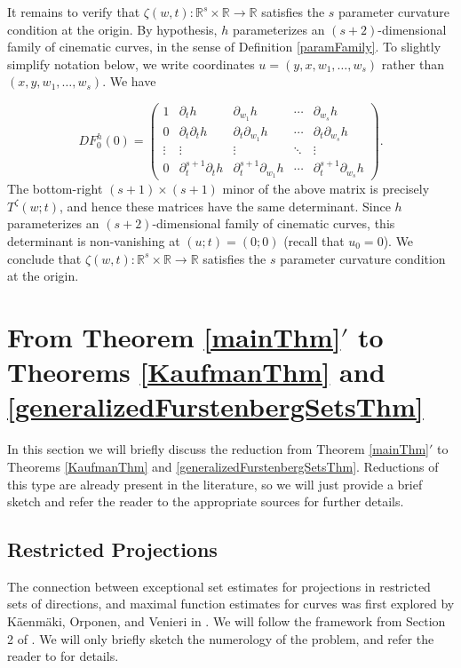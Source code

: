 \documentclass[letterpaper, reqno,11pt]{article}
\numberwithin{equation}{section}
\newcommand{\RR}{\mathbb{R}}
\numberwithin{thm}{section}
\theoremstyle{remark}
\begin{document}
It remains to verify that $\zeta(w,t)\colon \RR^s\times\RR\to\RR$ satisfies the $s$ parameter curvature condition at the origin. By hypothesis, $h$ parameterizes an $(s+2)$-dimensional family of cinematic curves, in the sense of Definition \ref{paramFamily}. To slightly simplify notation below, we write coordinates $u = (y, x, w_1,\ldots,w_s)$ rather than $(x,y, w_1,\ldots,w_s)$. We have

\begin{equation}\label{determinantH}
DF^h_0(0)=
%
\left( 
\begin{array}{ccccc}
1 & \partial_t h & \partial_{w_1}h  & \cdots & \partial_{w_s}h \\
0 & \partial_t\partial_t h & \partial_t \partial_{w_1}h  & \cdots & \partial_t \partial_{w_s}h \\
\vdots&\vdots&\vdots&\ddots & \vdots\\
0 & \partial_t^{s+1}\partial_t h & \partial_t^{s+1} \partial_{w_1}h& \cdots & \partial_t^{s+1} \partial_{w_s}h 
\end{array}
\right).
\end{equation}
The bottom-right $(s+1)\times (s+1)$ minor of the above matrix is precisely $T^\zeta(w;t)$, and hence these matrices have the same determinant. Since $h$ parameterizes an $(s+2)$-dimensional family of cinematic curves, this determinant is non-vanishing at $(u;t)=(0;0)$ (recall that $u_0 = 0$). We conclude that $\zeta(w,t)\colon \RR^s\times\RR\to\RR$ satisfies the $s$ parameter curvature condition at the origin.




\section{From Theorem \ref{mainThm}$'$ to Theorems \ref{KaufmanThm} and \ref{generalizedFurstenbergSetsThm}}\label{reductionMainThmsSection}
In this section we will briefly discuss the reduction from Theorem \ref{mainThm}$'$ to Theorems \ref{KaufmanThm} and \ref{generalizedFurstenbergSetsThm}. Reductions of this type are already present in the literature, so we will just provide a brief sketch and refer the reader to the appropriate sources for further details.

\subsection{Restricted Projections} 
The connection between exceptional set estimates for projections in restricted sets of directions, and maximal function estimates for curves was first explored by K\"{a}enm\"{a}ki, Orponen, and Venieri in \cite{KOV2021}. We will follow the framework from Section 2 of \cite{PYZ}. We will only briefly sketch the numerology of the problem, and refer the reader to \cite{PYZ} for details. 
\end{document}
